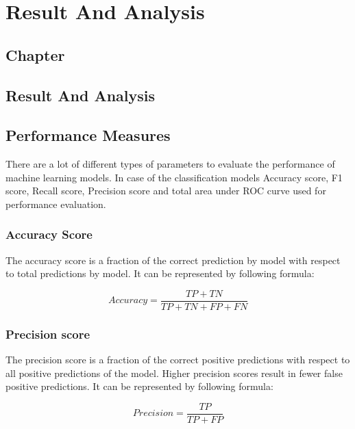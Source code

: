\thispagestyle{fancy}
\chapter{Result And Analysis} \label{ch:result_and_analysis}
\section*{\centering Chapter \thechapter}
\section*{\centering Result And Analysis}


\section{Performance Measures} \label{sec:performance_measures}
There are a lot of different types of parameters to evaluate the performance of machine
learning models. In case of the classification models Accuracy score, F1 score, Recall score,
Precision score and total area under ROC curve used for performance evaluation.

\subsection{Accuracy Score}\label{subsec:accuracy_score}
The accuracy score is a fraction of the correct prediction by model with respect to total
predictions by model. It can be represented by following formula:

\begin{equation}\label{eq:accuracy_score}
    Accuracy = \frac{TP+TN}{TP+TN+FP+FN}
\end{equation}

\subsection{Precision score}\label{subsec:precision_score}
The precision score is a fraction of the correct positive predictions with respect to all
positive predictions of the model. Higher precision scores result in fewer false positive
predictions. It can be represented by following formula:

\begin{equation}\label{eq:precision_score}
    Precision = \frac{TP}{TP+FP}
\end{equation}

